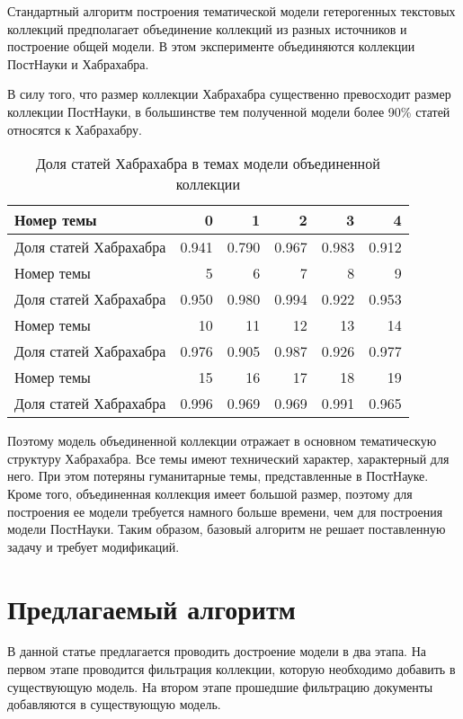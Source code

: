 Стандартный алгоритм построения тематической модели гетерогенных текстовых коллекций предполагает объединение коллекций из разных источников и построение общей модели. В этом эксперименте объединяются коллекции ПостНауки и Хабрахабра.

В силу того, что размер коллекции Хабрахабра существенно превосходит размер коллекции ПостНауки, в большинстве тем полученной модели более 90\% статей относятся к Хабрахабру.

\begin{table}[h!]
\centering
\vspace{1ex}
\begin{tabular}{l|r|r|r|r|r}
\hline
Номер темы & 0 & 1 & 2 & 3 & 4   \\
\hline
Доля статей Хабрахабра & 0.941 &  0.790 & 0.967 & 0.983 & 0.912  \\
\hline
\hline
Номер темы	&5 & 6 & 7 & 8 & 9 \\
\hline
Доля статей Хабрахабра & 0.950 & 0.980& 0.994 & 0.922 &  0.953  \\
\hline
\hline
Номер темы & 10 & 11 & 12  &13 & 14\\
\hline
Доля статей Хабрахабра & 0.976 &  0.905 & 0.987 &  0.926 &  0.977  \\
\hline
\hline
Номер темы & 15 & 16 & 17  &18 & 19   \\
\hline
Доля статей Хабрахабра & 0.996 & 0.969 &  0.969  &0.991 & 0.965 \\
\hline
\end{tabular}
\caption{Доля статей Хабрахабра в темах модели объединенной коллекции}
\end{table}

Поэтому модель объединенной коллекции отражает в основном тематическую структуру Хабрахабра. Все темы имеют технический характер, характерный для него. При этом потеряны гуманитарные темы, представленные в ПостНауке.
Кроме того, объединенная коллекция имеет большой размер, поэтому для построения ее модели требуется намного больше времени, чем для построения модели ПостНауки.
Таким образом, базовый алгоритм не решает поставленную задачу и требует модификаций.

\section{Предлагаемый алгоритм}

В данной статье предлагается проводить достроение модели в два этапа.
На первом этапе проводится фильтрация коллекции, которую необходимо добавить в существующую модель. На втором этапе прошедшие фильтрацию документы добавляются в существующую модель.

